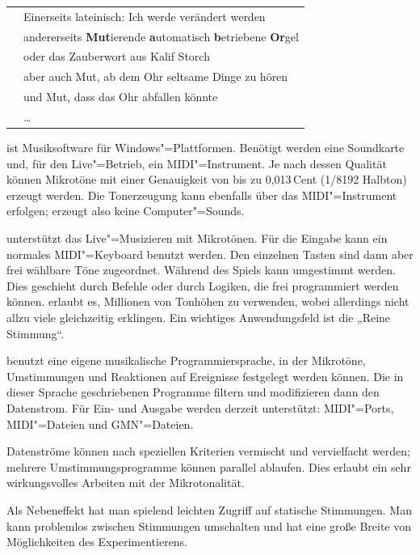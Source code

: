 \begin{tabular}{l@{\ \ --\ \ \ }l}
\mutabor{}  & Einerseits lateinisch: Ich werde verändert werden \\
\mutabor{}  & andererseits {\bf Mut}ierende {\bf a}utomatisch 
               {\bf b}etriebene {\bf Or}gel  \\
\mutabor{}  & oder das Zauberwort aus Kalif Storch \\
\mutabor{}  & aber auch Mut, ab dem Ohr seltsame Dinge zu hören \\
\mutabor{}  & und Mut, dass das Ohr abfallen könnte \\
\mutabor{}  & \ldots \\
\end{tabular}

\mutabor[~3] ist Musiksoftware für Windows"=Plattformen.  Benötigt
werden eine Soundkarte und, für den Live"=Betrieb, ein MIDI"=Instrument.
Je nach dessen Qualität können Mikrotöne mit einer
Genauigkeit von bis zu 0,013\,Cent (1/8192 Halbton) erzeugt werden. Die
Tonerzeugung kann ebenfalls über das MIDI"=Instrument erfolgen;
\mutabor{} erzeugt also keine Computer"=Sounds.

\mutabor{} unterstützt das Live"=Musizieren mit Mikrotönen.  Für die
Eingabe kann ein normales MIDI"=Keyboard benutzt werden.  Den einzelnen
Tasten sind dann aber frei wählbare Töne zugeordnet.  Während des
Spiels kann umgestimmt werden. Dies geschieht durch Befehle oder durch
Logiken, die frei programmiert werden können. \mutabor{} erlaubt es,
Millionen von Tonhöhen zu verwenden, wobei allerdings nicht
allzu viele gleichzeitig erklingen. Ein wichtiges Anwendungsfeld ist
die „Reine Stimmung“.

\mutabor{} benutzt eine eigene musikalische Programmiersprache, in der
Mikrotöne, Umstimmungen und Reaktionen auf Ereignisse festgelegt
werden können. Die in dieser Sprache geschriebenen Programme filtern
und modifizieren dann den Datenstrom. Für Ein- und Ausgabe werden
derzeit unterstützt: MIDI"=Ports, MIDI"=Dateien und GMN"=Dateien.

Datenströme können nach speziellen Kriterien vermischt und
vervielfacht werden; mehrere Umstimmungsprogramme können parallel
ablaufen. Dies erlaubt ein sehr wirkungsvolles Arbeiten mit der
Mikrotonalität.

Als Nebeneffekt hat man spielend leichten Zugriff auf statische 
Stimmungen. Man kann problemlos zwischen Stimmungen umschalten 
und hat eine große Breite von Möglichkeiten des Experimentierens.


